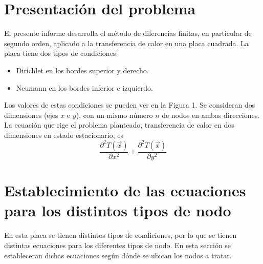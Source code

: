 \documentclass[12pt, notitlepage]{article}
\begin{document}
\section{Presentación del problema}
El presente informe desarrolla el método de diferencias finitas, en particular de segundo orden, aplicado a la transferencia de calor en una placa cuadrada. La placa tiene dos tipos de condiciones:
\begin{itemize}
\item{Dirichlet en los bordes superior y derecho.}
\item{Neumann en los bordes inferior e izquierdo.}
\end{itemize}

Los valores de estas condiciones se pueden ver en la Figura 1. Se consideran dos dimensiones (ejes $x$ e $y$), con un mismo número $n$ de nodos en ambas direcciones. La ecuación que rige el problema planteado, transferencia de calor en dos dimensiones en estado estacionario, es
\begin{equation}
\frac{\partial^2T(\vec{x})}{\partial x^2} + \frac{\partial^2T(\vec{x})}{\partial y^2}
\end{equation}


\section{Establecimiento de las ecuaciones para los distintos tipos de nodo}
En esta placa se tienen distintos tipos de condiciones, por lo que se tienen distintas ecuaciones para los diferentes tipos de nodo. En esta sección se estableceran dichas ecuaciones según dónde se ubican los nodos a tratar.
\end{document}
